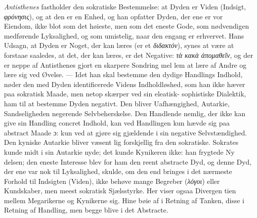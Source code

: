 \documentclass[12pt,a4paper]{book}
\newcommand{\gk}[1]{\textit{#1}}
\begin{document}
\emph{Antisthenes} fastholder den sokratiske Bestemmelse: at
Dyden er Viden (Indsigt, \gk{φρόνησις}), og at den er en Enhed,
og han opfatter Dyden, der ene er vor Eiendom, ikke blot
som det høieste, men som det eneste Gode, som nødvendigen
medførende Lyksalighed, og som umistelig, naar den engang
er erhvervet. Hans Udsagn, at Dyden er Noget, der kan
læres (er et \gk{διδακτόν}), synes at være at forstaae saaledes, at
det, der kan læres, er det Negative: \gk{τὰ κακὰ ἀπομαθεῖν}, og
der er neppe af Antisthenes gjort en skarpere Sondring mel\-%
lem at lære af Andre og lære sig ved Øvelse. --- Idet han
skal bestemme den dydige Handlings Indhold, nøder den med
Dyden identificerede Videns Indholdløshed, som han ikke hæver
paa sokratisk Maade, men netop skærper ved sin eleatisk-%
sophistiske Dialektik, ham til at bestemme Dyden negativt.
Den bliver Uafhængighed, Autarkie, Sandseligheden negerende
Selvbeherskelse. Den Handlende nemlig, der ikke kan give
sin Handling concret Indhold, kan ved Handlingen kun hævde
sig paa abstract Maade ɔ: kun ved at gjøre sig gjældende i sin
negative Selvstændighed. Den kyniske Autarkie bliver væsent\-%
lig forskjellig fra den sokratiske. Sokrates kunde midt i sin
Autarkie nyde; det kunde Kynikeren ikke: han frygtede Ny\-%
delsen; den eneste Interesse blev for ham den reent abstracte
Dyd, og denne Dyd, der ene var nok til Lyksalighed, skulde,
om den end bringes i det nærmeste Forhold til Indsigten
(Viden), ikke behøve mange Begreber (\gk{λόγοι}) eller Kundskaber,
men meest sokratisk Sjælsstyrke. Her viser ogsaa Divergen\-%
tien mellem Megarikerne og Kynikerne sig. Hine bøie af i
Retning af Tanken, disse i Retning af Handling, men begge
blive i det Abstracte.
\end{document}
